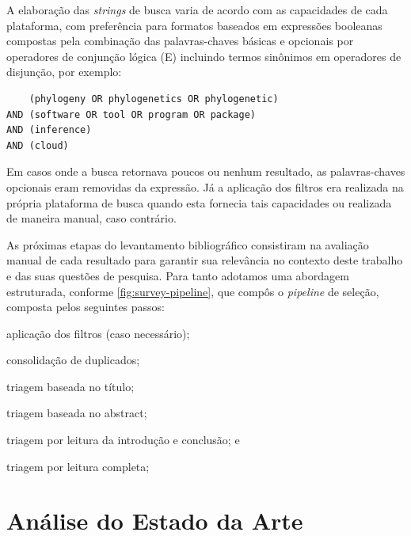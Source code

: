 \documentclass[english,brazilian]{UNISINOSmonografia} %
\begin{document}
A elaboração das \textit{strings} de busca varia de acordo com as capacidades de cada plataforma, com preferência para formatos baseados em expressões booleanas compostas pela combinação das palavras-chaves básicas e opcionais por operadores de conjunção lógica (E) incluindo termos sinônimos em operadores de disjunção, por exemplo:
\begin{verbatim}
    (phylogeny OR phylogenetics OR phylogenetic) 
AND (software OR tool OR program OR package) 
AND (inference) 
AND (cloud)
\end{verbatim}
Em casos onde a busca retornava poucos ou nenhum resultado, as palavras-chaves opcionais eram removidas da expressão.
Já a aplicação dos filtros era realizada na própria plataforma de busca quando esta fornecia tais capacidades ou realizada de maneira manual, caso contrário.


%


As próximas etapas do levantamento bibliográfico consistiram na avaliação manual de cada resultado para garantir sua relevância no contexto deste trabalho e das suas questões de pesquisa.
Para tanto adotamos uma abordagem estruturada, conforme \autoref{fig:survey-pipeline}, que compôs o \textit{pipeline} de seleção, composta pelos seguintes passos:
\begin{inparaenum}[I)]
	\item aplicação dos filtros (caso necessário);
	\item consolidação de duplicados;
	\item triagem baseada no título;
	\item triagem baseada no abstract;
	\item triagem por leitura da introdução e conclusão; e 
	\item triagem por leitura completa;
\end{inparaenum}




\section{Análise do Estado da Arte}
\label{sec:analise-estadodaarte}
\end{document}
